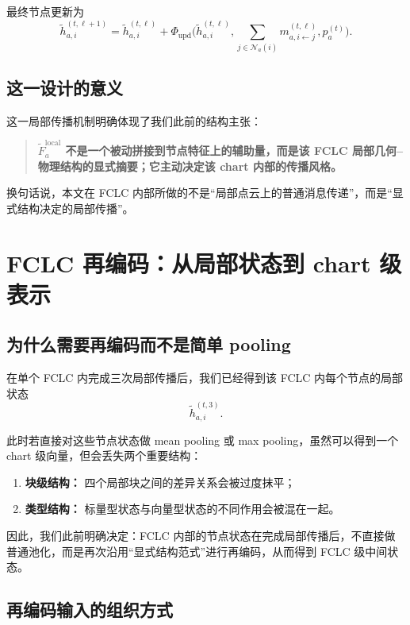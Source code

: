 \documentclass[12pt,a4paper]{ctexart}
\begin{document}
最终节点更新为
\[
\tilde h_{a,i}^{(t,\ell+1)}
=
\tilde h_{a,i}^{(t,\ell)}
+
\Phi_{\mathrm{upd}}
\Big(
\tilde h_{a,i}^{(t,\ell)},
\sum_{j\in\mathcal N_a(i)}m_{a,i\leftarrow j}^{(t,\ell)},
p_a^{(t)}
\Big).
\]

\subsection{这一设计的意义}

这一局部传播机制明确体现了我们此前的结构主张：

\begin{quote}
\textbf{\(\tilde F_a^{\mathrm{local}}\) 不是一个被动拼接到节点特征上的辅助量，而是该 FCLC 局部几何--物理结构的显式摘要；它主动决定该 chart 内部的传播风格。}
\end{quote}

换句话说，本文在 FCLC 内部所做的不是“局部点云上的普通消息传递”，而是“显式结构决定的局部传播”。

\bigskip
\noindent

\section{FCLC 再编码：从局部状态到 chart 级表示}

\subsection{为什么需要再编码而不是简单 pooling}

在单个 FCLC 内完成三次局部传播后，我们已经得到该 FCLC 内每个节点的局部状态
\[
\tilde h_{a,i}^{(t,3)}.
\]

此时若直接对这些节点状态做 mean pooling 或 max pooling，虽然可以得到一个 chart 级向量，但会丢失两个重要结构：

\begin{enumerate}[leftmargin=2em]
    \item \textbf{块级结构：} 四个局部块之间的差异关系会被过度抹平；
    \item \textbf{类型结构：} 标量型状态与向量型状态的不同作用会被混在一起。
\end{enumerate}

因此，我们此前明确决定：FCLC 内部的节点状态在完成局部传播后，不直接做普通池化，而是再次沿用“显式结构范式”进行再编码，从而得到 FCLC 级中间状态。

\subsection{再编码输入的组织方式}
\end{document}
